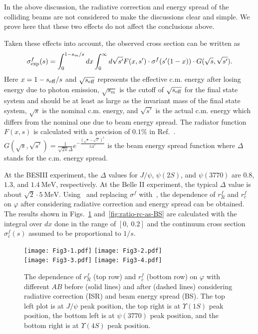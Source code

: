 \documentclass[%
preprint,
 amsmath,amssymb,
 aps,
]{revtex4-2}
\newcommand{\psip}{\psi(2S)}
\newcommand{\psipp}{\psi(3770)}
\newcommand{\jpsi}{J/\psi}
\newcommand{\upsi}{\Upsilon(1S)}
\newcommand{\mev}{\mathrm{MeV}}
\begin{document}
In the above discussion, the radiative correction and energy spread of the colliding 
beams are not considered to make the discussions clear and simple. We prove here 
that these two effects do not affect the conclusions above. 

Taken these effects into account, the observed cross section 
can be written as
\begin{equation}\label{eq2:observe-cs}
    \sigma_{\rm exp}^f(s)=\int_{0}^{1-s_{m}/s}dx\int_{0}^{\infty}d\sqrt{s'}F(x,s')
    \cdot\sigma^f(s'(1-x))\cdot G(\sqrt{s},\sqrt{s'}).
\end{equation}
Here $x=1-s_{\rm eff}/s$ and $\sqrt{s_{\rm eff}}$ represents the effective c.m. 
energy after losing energy due to photon emission, $\sqrt{s_{m}}$ is the cutoff 
of $\sqrt{s_{\rm eff}}$ for the final state system and should be at least as large 
as the invariant mass of the final state system, $\sqrt{s}$ is the nominal c.m. 
energy, and $\sqrt{s'}$ is the actual c.m. energy which differs from the nominal 
one due to beam energy spread. The radiator function $F(x,s)$ is calculated 
with a precision of $0.1\%$ in Ref.~\cite{radiator-function}. 
$G(\sqrt{s},\sqrt{s'})=\frac{1}{\sqrt{2\pi}\Delta}e^{-\frac{(\sqrt{s}-\sqrt{s'})^2}
{2\Delta^2}}$ is the 
beam energy spread function where $\Delta$ stands for the c.m. energy spread. 

At the BESIII experiment, the $\Delta$ values for $\jpsi$, $\psip$, and $\psipp$ are 
$0.8$, $1.3$, and $1.4~\mev$, respectively. At the Belle II experiment, the typical 
$\Delta$ value is about $\sqrt{2}\cdot 5~\mev$. Using~ and 
replacing $\sigma^{f}$ with~, the dependence of 
$r_{R}^{f}$ and $r_{c}^{f}$ on $\varphi$ after considering 
radiative correction and energy spread can be obtained. The results shown in 
Figs.~\ref{fig:r-jpsi-ISR-BS} and~\ref{fig:ratio-rc-as-BS} are 
calculated with the integral over $dx$ done in the range of $[0,~0.2]$ and 
the continuum cross section $\sigma_{c}^{f}(s)$ assumed to be proportional to $1/s$.

\begin{figure}[htbp]
    \centering
    \texttt{[image: Fig3-1.pdf]}
    \texttt{[image: Fig3-2.pdf]}\\
    \texttt{[image: Fig3-3.pdf]}
    \texttt{[image: Fig3-4.pdf]}
\caption{The dependence of $r_{R}^{f}$ (top row) and $r_{c}^{f}$
(bottom row) on $\varphi$ 
with different $AB$ before (solid lines) and after (dashed lines) considering 
radiative correction 
(ISR) and beam energy spread (BS). The top left plot is at $\jpsi$ peak position, 
the top right is at $\upsi$ peak position, the bottom left is at $\psipp$ peak 
position, and the bottom right is at $\Upsilon(4S)$ peak position. }
    \label{fig:r-jpsi-ISR-BS}
\end{figure}
\end{document}
